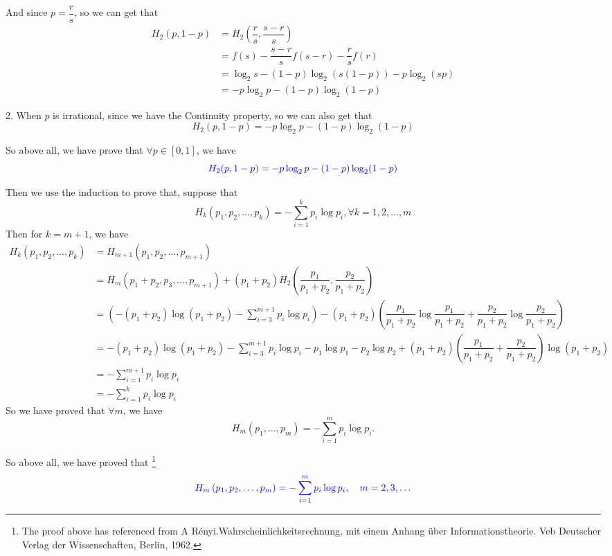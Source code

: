 And since $p=\dfrac{r}{s}$, so we can get that
\begin{align*}
H_2(p,1-p) &= H_2(\dfrac{r}{s},\dfrac{s-r}{s}) \\
&= f(s) -\dfrac{s-r}{s}f(s-r) - \dfrac{r}{s}f(r) \\
&= \log_2 s - (1-p)\log_2\left(s(1-p)\right) - p\log_2(sp) \\
&= -p\log_2p - (1-p)\log_2(1-p)
\end{align*}

2. When $p$ is irrational, since we have the Continuity property, so we can also get that
$$H_2(p,1-p) = -p\log_2p - (1-p)\log_2(1-p)$$

So above all, we have prove that $\forall p\in[0,1]$, we have
$$\textcolor{blue}{H_2(p,1-p) = -p\log_2p - (1-p)\log_2(1-p)}$$

Then we use the induction to prove that, suppose that
$$H_k(p_1, p_2, \ldots, p_k)=-\sum_{i=1}^k p_i \log p_i, \forall k=1,2,\ldots,m$$
Then for $k=m+1$, we have
\begin{align*}
H_k(p_1, p_2, \ldots, p_k) &= H_{m+1}(p_1, p_2, \ldots, p_{m+1}) \\
&= H_{m}(p_1+p_2, p_3, \ldots, p_{m+1}) + (p_1+p_2)H_2\left(\dfrac{p_1}{p_1+p_2}, \dfrac{p_2}{p_1+p_2}\right) \\
&= \left(-(p_1+p_2)\log(p_1+p_2)-\sum_{i=3}^{m+1}p_i\log p_i\right) - (p_1+p_2)\left(\dfrac{p_1}{p_1+p_2}\log\dfrac{p_1}{p_1+p_2} + \dfrac{p_2}{p_1+p_2}\log\dfrac{p_2}{p_1+p_2}\right) \\
&= -(p_1+p_2)\log(p_1+p_2)-\sum_{i=3}^{m+1}p_i\log p_i - p_1\log p_1 - p_2\log p_2 + (p_1+p_2)(\dfrac{p_1}{p_1+p_2}+\dfrac{p_2}{p_1+p_2})\log(p_1+p_2) \\
&= -\sum_{i=1}^{m+1}p_i\log p_i \\
&= -\sum_{i=1}^k p_i \log p_i
\end{align*}
So we have proved that $\forall m$, we have
$$H_m(p_1,\ldots,p_m)=-\sum_{i=1}^mp_i\log p_i.$$

So above all, we have proved that \footnote{The proof above has referenced from A Rényi.Wahrscheinlichkeitsrechnung, mit einem Anhang über Informationstheorie. Veb Deutscher Verlag der Wissenschaften, Berlin, 1962.}
$$\textcolor{blue}{H_m\left(p_1, p_2, \ldots, p_m\right)=-\sum_{i=1}^m p_i \log p_i, \quad m=2,3, \ldots}$$